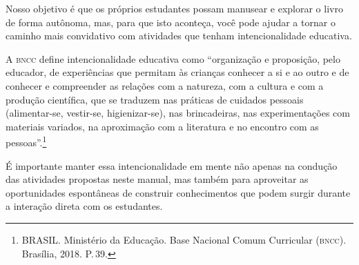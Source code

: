 \documentclass[11pt]{extarticle}
\begin{document}
Nosso objetivo é que os próprios estudantes possam manusear 
e explorar o livro de forma autônoma, mas, para que isto aconteça, você 
pode ajudar a tornar o caminho mais convidativo com atividades que tenham 
intencionalidade educativa. 

A \textsc{bncc} define intencionalidade educativa como ``organização 
e proposição, pelo educador, de experiências que permitam às crianças 
conhecer a si e ao outro e de conhecer e compreender as relações com a 
natureza, com a cultura e com a produção científica, que se traduzem nas 
práticas de cuidados pessoais (alimentar-se, vestir-se, higienizar-se), 
nas brincadeiras, nas experimentações com materiais 
variados, na aproximação com a literatura e no encontro com as 
pessoas''.\footnote{BRASIL. Ministério da Educação. Base Nacional Comum Curricular (\textsc{bncc}). Brasília, 2018. P.\,39.}

É importante manter essa intencionalidade em mente não apenas na condução 
das atividades propostas neste manual, mas também para aproveitar as 
oportunidades espontâneas de construir conhecimentos que podem surgir durante 
a interação direta com os estudantes.
\end{document}

